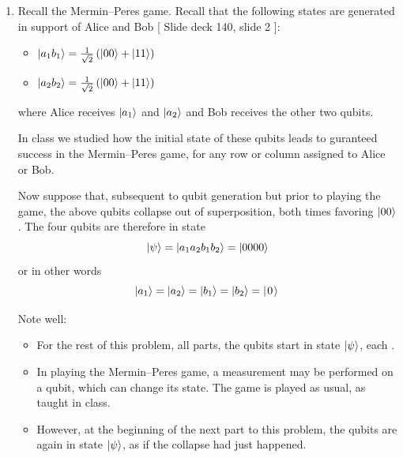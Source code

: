 \documentclass[12pt]{article}
\begin{document}
\begin{enumerate}
\item{} Recall the Mermin--Peres game. Recall that the following states are generated in support of Alice and Bob [ Slide deck 140, slide 2 ]:
\begin{itemize}
    \item $\ket{a_{1}b_{1}} = \frac{1}{\sqrt{2}}{}\left(\ket{00} + \ket{11}\right)$
    \item $\ket{a_{2}b_{2}} = \frac{1}{\sqrt{2}}{}\left(\ket{00} + \ket{11}\right)$
\end{itemize}
where Alice receives $\ket{a_{1}}$ and $\ket{a_{2}}$ and Bob receives the other two qubits.

In class we studied how the initial state of these qubits leads to guranteed success in the Mermin--Peres game, for any row or column assigned to Alice or Bob.

Now suppose that, subsequent to qubit generation but prior to playing the game, the above qubits collapse out of superposition, both times favoring $\ket{00}$.  The four qubits are therefore in state  \[
\ket{\psi} = \ket{a_{1}a_{2}b_{1}b_{2}} = \ket{0000} \]
or in other words \[\ket{a_1}=\ket{a_2}=\ket{b_1}=\ket{b_2}=\QZero{}
\]

Note well:
\begin{itemize}
\item For the rest of this problem, all parts, the qubits start in state $\ket{\psi}$, each \QZero{}.
\item In playing the Mermin--Peres game, a measurement may be performed on a qubit, which can change its state.  The game is played as usual, as taught in class.
\item However, at the beginning of the next part to this problem, the qubits are again in state $\ket{\psi}$, as if the collapse had just happened.
\end{itemize}


\end{enumerate}
\end{document}
